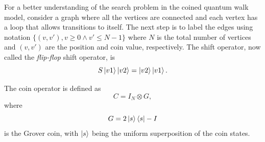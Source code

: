 \documentclass[../../dissertation.tex]{subfiles}
\begin{document}
For a better understanding of the search problem in the coined quantum walk
model, consider a graph where all the vertices are connected and each vertex
has a loop that allows transitions to itself.  The next step is to label the
edges using notation $\{(v,v'), v \geqslant 0 \land v' \leqslant N-1\}$ where
$N$ is the total number of vertices and $(v,v')$ are the position and coin
value, respectively.  The shift operator, now called the \textit{flip-flop} shift
operator, is
\begin{equation}
	S\ket{v1}\ket{v2} = \ket{v2}\ket{v1}.
	\label{eq:chap3FlipFlop}
\end{equation}\par
The coin operator is defined as
\begin{equation}
	C = I_N \otimes G,
\end{equation}
where 
\begin{equation}
	G = 2\ket{s}\bra{s} - I
\end{equation}
is the Grover coin, with $\ket{s}$ being the uniform superposition of the coin states.\par
\end{document}
